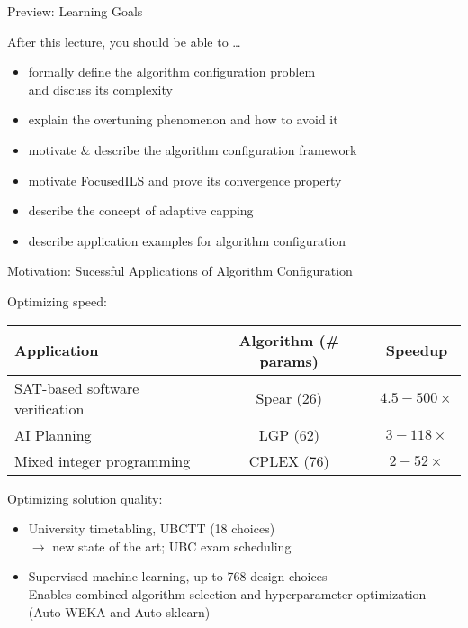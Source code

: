 \begin{frame}[c]{Preview: Learning Goals}

After this lecture, you should be able to \ldots

\begin{itemize}
  \item \alert{formally} define the algorithm configuration problem \\and discuss its
  complexity
  \item explain the \alert{overtuning} phenomenon and how to avoid it
\pause
\medskip
  \item motivate \& describe the algorithm configuration framework \alert{\paramils{}}
  \item motivate \alert{FocusedILS} and prove its \alert{convergence} property
  \item describe the concept of \alert{adaptive capping}  
\pause
\medskip
  \item describe \alert{application examples} for algorithm configuration
\end{itemize}
\end{frame}



\begin{frame}[c,fragile]{Motivation: Sucessful Applications of Algorithm Configuration}

Optimizing speed:

\begin{tabular}{l cc}
\hline
Application & Algorithm (\# params) & Speedup \\
\hline
SAT-based software verification & Spear (26) & \alert{$4.5-500 \times$}\\
AI Planning & LGP (62)	& \alert{$3-118 \times$} \\
Mixed integer programming & CPLEX (76) & \alert{$2-52\times$}\\ 
\hline
\end{tabular}

\pause
\bigskip

Optimizing solution quality:
\begin{itemize}
  \item University timetabling, UBCTT (18 choices)\\
  $\to$ new state of the art; \alert{UBC exam scheduling}
\medskip
\pause
  \item Supervised machine learning, up to 768 design choices\\
   Enables \alert{combined algorithm selection and hyperparameter optimization} (Auto-WEKA and Auto-sklearn) 
\end{itemize}

\end{frame}


